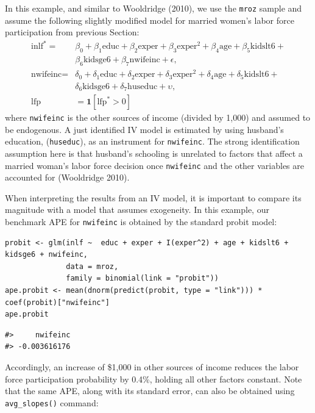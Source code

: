 In this example, and similar to Wooldridge (2010), we use the \texttt{mroz} sample and assume the following slightly modified model for married women's labor force participation from previous Section:
\begin{align*}
  \text{inlf}^* = &  \beta_0 + \beta_1\text{educ} + \beta_2 \text{exper} + \beta_3\text{exper}^2+\beta_4\text{age}+\beta_5 \text{kidslt6} +\\
                    &  \beta_6 \text{kidsge6}+\beta_7\text{nwifeinc}+ \epsilon, \\
  \text{nwifeinc} = & \delta_0 + \delta_1\text{educ} + \delta_2 \text{exper} + \delta_3\text{exper}^2+\delta_4\text{age}+\delta_5 \text{kidslt6} +\\
                    &  \delta_6 \text{kidsge6}+\delta_7\text{huseduc}+ \upsilon, \\          \text{lfp}   & =  \mathbf{1}\left[\text{lfp}^* > 0\right]
\end{align*}
where \texttt{nwifeinc} is the other sources of income (divided by 1,000) and assumed to be endogenous. A just identified IV model is estimated by using husband's education, (\texttt{huseduc}), as an instrument for \texttt{nwifeinc}. The strong identification assumption here is that husband's schooling is unrelated to factors that affect a married woman's labor force decision once \texttt{nwifeinc} and the other variables are accounted for (Wooldridge 2010).

When interpreting the results from an IV model, it is important to compare its magnitude with a model that assumes exogeneity. In this example, our benchmark APE for \texttt{nwifeinc} is obtained by the standard probit model:

\begin{verbatim}
probit <- glm(inlf ~  educ + exper + I(exper^2) + age + kidslt6 + kidsge6 + nwifeinc, 
              data = mroz, 
              family = binomial(link = "probit"))
ape.probit <- mean(dnorm(predict(probit, type = "link"))) * coef(probit)["nwifeinc"]
ape.probit
\end{verbatim}

\begin{verbatim}
#>     nwifeinc 
#> -0.003616176
\end{verbatim}

Accordingly, an increase of \$1,000 in other sources of income reduces the labor force participation probability by 0.4\%, holding all other factors constant. Note that the same APE, along with its standard error, can also be obtained using \texttt{avg\_slopes()} command:

